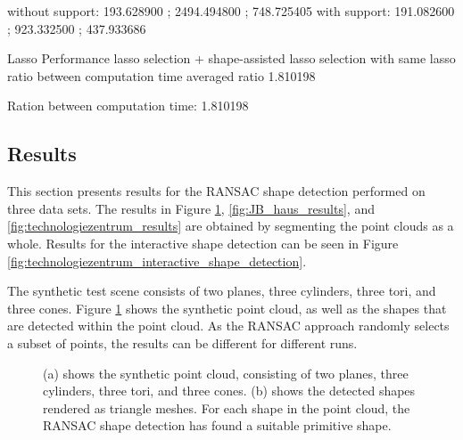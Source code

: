 without support: 193.628900 ; 2494.494800 ; 748.725405
with support: 191.082600 ; 923.332500 ; 437.933686

Lasso Performance lasso selection + shape-assisted lasso selection with same lasso ratio between computation time averaged ratio 1.810198

Ration between computation time: 1.810198


\subsection{Results}

This section presents results for the RANSAC shape detection performed on three data sets. The results in Figure \ref{fig:synthetic_point_cloud_results}, \ref{fig:JB_haus_results}, and \ref{fig:technologiezentrum_results} are obtained by segmenting the point clouds as a whole. Results for the interactive shape detection can be seen in Figure \ref{fig:technologiezentrum_interactive_shape_detection}. 

The synthetic test scene consists of two planes, three cylinders, three tori, and three cones.  Figure \ref{fig:synthetic_point_cloud_results} shows the synthetic point cloud, as well as the shapes that are detected within the point cloud. As the RANSAC approach randomly selects a subset of points, the results can be different for different runs. 

\begin{figure}[h]
\centering
{}
\caption[Rendering of the synthetic point cloud in (a), rendering of the detected shapes in (b)]
{(a) shows the synthetic point cloud, consisting of two planes, three cylinders, three tori, and three cones. (b) shows the detected shapes rendered as triangle meshes. For each shape in the point cloud, the RANSAC shape detection has found a suitable primitive shape. }
\label{fig:synthetic_point_cloud_results}
\end{figure}

